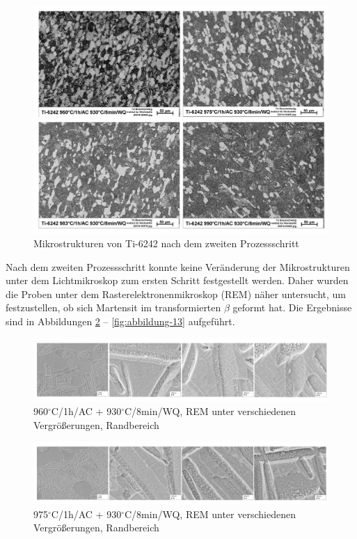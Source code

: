 \pagebreak

\begin{figure}[h]
	\centering
	\includegraphics[width=0.9\linewidth]{./Bilder/Abbildung 9}
	\caption[Abbildung 9]{Mikrostrukturen von Ti-6242 nach dem zweiten Prozessschritt}
	\label{fig:abbildung-9}
\end{figure}

Nach dem zweiten Prozessschritt konnte keine Veränderung der Mikrostrukturen unter dem Lichtmikroskop zum ersten Schritt festgestellt werden. Daher wurden die Proben unter dem Rasterelektronenmikroskop (REM) näher untersucht, um festzustellen, ob sich Martensit im transformierten $\beta$ geformt hat. Die Ergebnisse sind in Abbildungen \ref{fig:abbildung-10} -- \ref{fig:abbildung-13} aufgeführt. 

\begin{figure}[!]
	\centering
	\includegraphics[width=0.9\linewidth]{./Bilder/Abbildung 10}
	\caption[Abbildung 10]{960$^\circ$C/1h/AC + 930$^\circ$C/8min/WQ, REM unter verschiedenen Vergrößerungen, Randbereich}
	\label{fig:abbildung-10}
\end{figure}

\begin{figure}[!]
	\centering
	\includegraphics[width=0.9\linewidth]{./Bilder/Abbildung 11}
	\caption[Abbildung 11]{975$^\circ$C/1h/AC + 930$^\circ$C/8min/WQ, REM unter verschiedenen Vergrößerungen, Randbereich}
	\label{fig:abbildung-11}
\end{figure}

